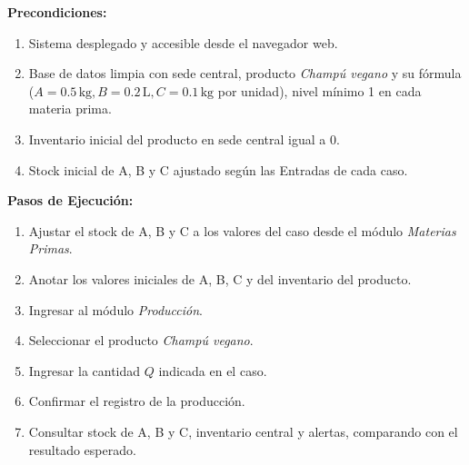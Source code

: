\documentclass[11pt,a4paper]{article}
\begin{document}
\begin{tcolorbox}[colback=lightgray,colframe=secondary,title=\textbf{Procedimiento F3: Registro de Producción}]
\textbf{Precondiciones:}
\begin{enumerate}[noitemsep]
    \item Sistema desplegado y accesible desde el navegador web.
    \item Base de datos limpia con sede central, producto \textit{Champú vegano} y su fórmula ($A=0.5\,\text{kg}, B=0.2\,\text{L}, C=0.1\,\text{kg}$ por unidad), nivel mínimo 1 en cada materia prima.
    \item Inventario inicial del producto en sede central igual a 0.
    \item Stock inicial de A, B y C ajustado según las Entradas de cada caso.
\end{enumerate}
\textbf{Pasos de Ejecución:}
\begin{enumerate}[noitemsep]
    \item Ajustar el stock de A, B y C a los valores del caso desde el módulo \textit{Materias Primas}.
    \item Anotar los valores iniciales de A, B, C y del inventario del producto.
    \item Ingresar al módulo \textit{Producción}.
    \item Seleccionar el producto \textit{Champú vegano}.
    \item Ingresar la cantidad $Q$ indicada en el caso.
    \item Confirmar el registro de la producción.
    \item Consultar stock de A, B y C, inventario central y alertas, comparando con el resultado esperado.
\end{enumerate}
\end{tcolorbox}
\end{document}
